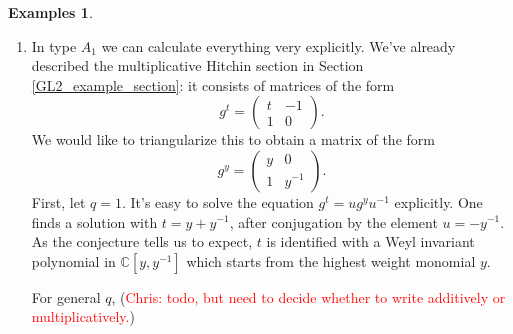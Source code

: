 \documentclass[11pt, oneside, reqno]{amsart}
\theoremstyle{definition} \newtheorem{definition}{Definition}[section]
\theoremstyle{definition} \newtheorem{remark}[definition]{Remark}
\theoremstyle{definition} \newtheorem{remarks}[definition]{Remarks}
\theoremstyle{definition} \newtheorem{question}[definition]{Question}
\theoremstyle{definition} \newtheorem*{note}{Note}
\theoremstyle{definition} \newtheorem{example}[definition]{Example}
\theoremstyle{definition} \newtheorem{examples}[definition]{Examples}
\newcommand{\chris}[1]{(\textcolor{red}{Chris: #1})}
\begin{document}
\begin{examples}
\begin{enumerate}
 \item In type $A_1$ we can calculate everything very explicitly.  We've already described the multiplicative Hitchin section in Section \ref{GL2_example_section}: it consists of matrices of the form
\begin{equation*}
  g^{t} =
  \begin{pmatrix}
    t   & - 1 \\
    1 & 0
  \end{pmatrix}.
\end{equation*}
We would like to triangularize this to obtain a matrix of the form
\begin{equation*}
  g^{y} =
  \begin{pmatrix}
    y  & 0 \\
    1 & y^{-1} 
  \end{pmatrix}.
\end{equation*}
First, let $q=1$.  It's easy to solve the equation $g^t = ug^y u^{-1}$ explicitly.  One finds a solution with $t = y + y^{-1}$, after conjugation by the element $u = - y^{-1}$.  As the conjecture tells us to expect, $t$ is identified with a Weyl invariant polynomial in $\mathbb{C}[y, y^{-1}]$ which starts from the highest weight monomial $y$. 

For general $q$, \chris{todo, but need to decide whether to write additively or multiplicatively.}


\end{enumerate}
\end{examples}
\end{document}
